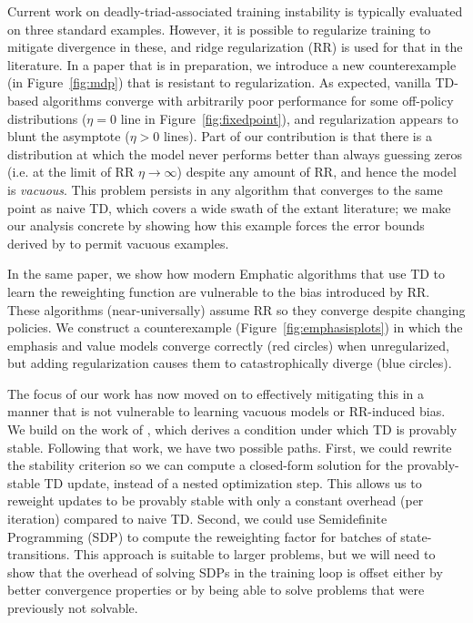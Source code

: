 \documentclass[11pt]{article}
\begin{document}
Current work on deadly-triad-associated training instability is typically evaluated on three standard examples. However, it is possible to regularize training to mitigate divergence in these, and ridge regularization (RR) is used for that in the literature.
In a paper that is in preparation, we introduce a new counterexample (in Figure~\ref{fig:mdp}) that is resistant to regularization. As expected, vanilla TD-based algorithms converge with arbitrarily poor performance for some off-policy distributions ($\eta=0$ line in Figure~\ref{fig:fixedpoint}), and regularization appears to blunt the asymptote ($\eta > 0$ lines). Part of our contribution is that there is a distribution at which the model never performs better than always guessing zeros (i.e. at the limit of RR $\eta\to\infty$) despite any amount of RR, and hence the model is \emph{vacuous}. This problem persists in any algorithm that converges to the same point as naive TD, which covers a wide swath of the extant literature; we make our analysis concrete by showing how this example forces the error bounds derived by \citet{zhang2021breaking} to permit vacuous examples.

In the same paper, we show how modern Emphatic algorithms that use TD to learn the reweighting function are vulnerable to the bias introduced by RR. These algorithms (near-universally) assume RR so they converge despite changing policies. We construct a counterexample (Figure~\ref{fig:emphasisplots}) in which the emphasis and value models converge correctly (red circles) when unregularized, but adding regularization causes them to catastrophically diverge (blue circles).

The focus of our work has now moved on to effectively mitigating this in a manner that is not vulnerable to learning vacuous models or RR-induced bias. We build on the work of \citet{kolter2011fixed}, which derives a condition under which TD is provably stable. Following that work, we have two possible paths. First, we could rewrite the stability criterion so we can compute a closed-form solution for the provably-stable TD update, instead of a nested optimization step. This allows us to reweight updates to be provably stable with only a constant overhead (per iteration) compared to naive TD. Second, we could use Semidefinite Programming (SDP) to compute the reweighting factor for batches of state-transitions. This approach is suitable to larger problems, but we will need to show that the overhead of solving SDPs in the training loop is offset either by better convergence properties or by being able to solve problems that were previously not solvable.
\end{document}
